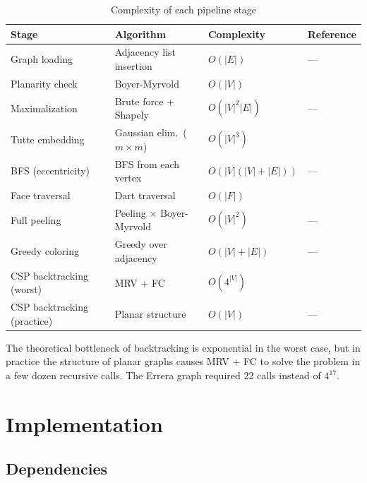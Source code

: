\documentclass[12pt,letterpaper]{article}
\theoremstyle{plain}
\theoremstyle{definition}
\theoremstyle{remark}
\begin{document}
\begin{table}[H]
\centering
\caption{Complexity of each pipeline stage}
\label{tab:complexity}
\begin{tabular}{llll}
\toprule
\textbf{Stage} & \textbf{Algorithm} & \textbf{Complexity} & \textbf{Reference} \\
\midrule
Graph loading        & Adjacency list insertion  & $O(|E|)$             & --- \\
Planarity check      & Boyer-Myrvold             & $O(|V|)$             & \cite{boyermyrvold1999} \\
Maximalization       & Brute force + Shapely     & $O(|V|^2 |E|)$       & --- \\
Tutte embedding      & Gaussian elim.\ ($m \times m$) & $O(|V|^3)$      & \cite{tutte1963} \\
BFS (eccentricity)   & BFS from each vertex      & $O(|V|(|V|+|E|))$    & --- \\
Face traversal       & Dart traversal            & $O(|F|)$             & \cite{mohar2001} \\
Full peeling         & Peeling $\times$ Boyer-Myrvold & $O(|V|^2)$      & --- \\
Greedy coloring      & Greedy over adjacency     & $O(|V|+|E|)$         & --- \\
CSP backtracking (worst) & MRV + FC              & $O(4^{|V|})$         & \cite{haralick1980} \\
CSP backtracking (practice) & Planar structure  & $O(|V|)$             & --- \\
\bottomrule
\end{tabular}
\end{table}

The theoretical bottleneck of backtracking is exponential in the worst case, but
in practice the structure of planar graphs causes MRV + FC to solve the problem
in a few dozen recursive calls. The Errera graph required 22 calls instead of
$4^{17}$.

\section{Implementation}
\label{sec:implementation}

\subsection{Dependencies}
\end{document}

